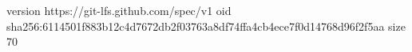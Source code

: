 version https://git-lfs.github.com/spec/v1
oid sha256:6114501f883b12c4d7672db2f03763a8df74ffa4cb4ece7f0d14768d96f2f5aa
size 70
